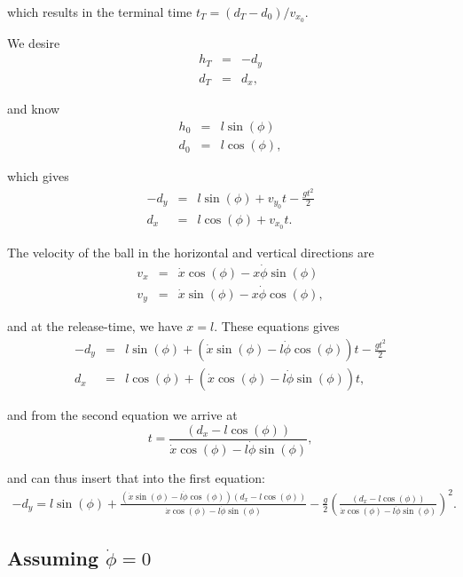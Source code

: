 which results in the terminal time $t_{T}=(d_{T}-d_{0})/v_{x_{0}}$.

We desire 
\begin{eqnarray*}
h_{T} & = & -d_{y}\\
d_{T} & = & d_{x},
\end{eqnarray*}


and know
\begin{eqnarray*}
h_{0} & = & l\sin(\phi)\\
d_{0} & = & l\cos(\phi),
\end{eqnarray*}


which gives
\begin{eqnarray*}
-d_{y} & = & l\sin(\phi)+v_{y_{0}}t-\frac{gt^{2}}{2}\\
d_{x} & = & l\cos(\phi)+v_{x_{0}}t.
\end{eqnarray*}


The velocity of the ball in the horizontal and vertical directions
are
\begin{eqnarray*}
v_{x} & = & \dot{x}\cos(\phi)-x\dot{\phi}\sin(\phi)\\
v_{y} & = & \dot{x}\sin(\phi)-x\dot{\phi}\cos(\phi),
\end{eqnarray*}


and at the release-time, we have $x=l$. These equations gives
\begin{eqnarray*}
-d_{y} & = & l\sin(\phi)+\left(\dot{x}\sin(\phi)-l\dot{\phi}\cos(\phi)\right)t-\frac{gt^{2}}{2}\\
d_{x} & = & l\cos(\phi)+\left(\dot{x}\cos(\phi)-l\dot{\phi}\sin(\phi)\right)t,
\end{eqnarray*}


and from the second equation we arrive at 
\[
t=\frac{\left(d_{x}-l\cos(\phi)\right)}{\dot{x}\cos(\phi)-l\dot{\phi}\sin(\phi)},
\]


and can thus insert that into the first equation:
\begin{gather*}
-d_{y}=l\sin(\phi)+\frac{\left(\dot{x}\sin(\phi)-l\dot{\phi}\cos(\phi)\right)\left(d_{x}-l\cos(\phi)\right)}{\dot{x}\cos(\phi)-l\dot{\phi}\sin(\phi)}-\frac{g}{2}\left(\frac{\left(d_{x}-l\cos(\phi)\right)}{\dot{x}\cos(\phi)-l\dot{\phi}\sin(\phi)}\right)^{2}.
\end{gather*}



\subsection{Assuming $\dot{\phi}=0$}


